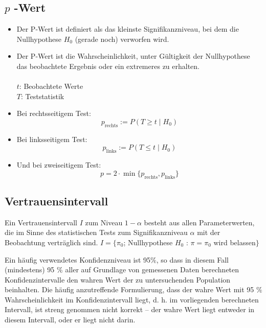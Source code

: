 \documentclass{article}
\begin{document}
\begin{multicols*}{3}
    \subsection{$p$ -Wert}
    \begin{itemize}
      \item Der P-Wert ist definiert als das kleinste Signifikanzniveau,
      bei dem die Nullhypothese $H_0$ (gerade noch) verworfen wird.
      \item Der P-Wert ist die Wahrscheinlichkeit, unter Gültigkeit der Nullhypothese
      das beobachtete Ergebnis oder ein extremeres zu erhalten.\\\\
      $t$: Beobachtete Werte \\
      $T$: Teststatistik \\
      \item Bei rechtsseitigem Test:
      $${\displaystyle p_{\text{rechts}}:=P(T\geq t\mid H_{0})}$$
      \item Bei linksseitigem Test:
      $${\displaystyle p_{\text{links}}:=P(T\leq t\mid H_{0})}$$
      \item Und bei zweiseitigem Test:
      $${\displaystyle p=2\cdot \min\{p_{\text{rechts}},p_{\text{links}}\}}$$
    \end{itemize}

    \subsection{Vertrauensintervall}
    Ein Vertrauensintervall $I$ zum Niveau $1 - \alpha$ besteht aus allen Parameterwerten,
    die im Sinne des statistischen Tests zum Signifikanzniveau $\alpha$ mit der Beobachtung
    verträglich sind.
    $I=\{\pi _0$; Nullhypothese $H_0$ : $\pi = \pi _0$ wird belassen$\}$

    Ein häufig verwendetes Konfidenzniveau ist 95$\% $, so dass in diesem Fall (mindestens) 95 $\%$ aller auf Grundlage von gemessenen Daten berechneten Konfidenzintervalle den wahren Wert der zu untersuchenden Population beinhalten.
    Die häufig anzutreffende Formulierung, dass der wahre Wert mit 95 $\%$ Wahrscheinlichkeit im Konfidenzintervall liegt, d. h. im vorliegenden berechneten Intervall, ist streng genommen nicht korrekt – der wahre Wert liegt entweder in diesem Intervall, oder er liegt nicht darin.


\end{multicols*}
\end{document}
